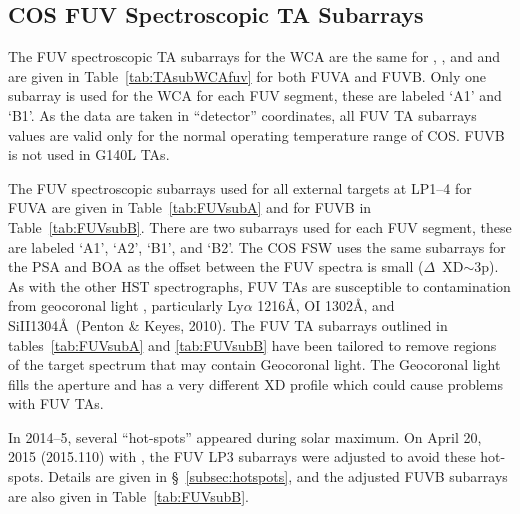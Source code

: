 \subsection{COS FUV Spectroscopic TA Subarrays}\label{subsec:FUVsupSUBS}
The FUV spectroscopic TA subarrays for the WCA are the same for ,  , and 
and are given in Table~\ref{tab:TAsubWCAfuv} for both FUVA and FUVB.
Only one subarray is used for the WCA for each FUV segment, these are labeled `A1' and `B1'.
As the data are taken in ``detector'' coordinates, all FUV TA subarrays values are valid only for the normal operating temperature range of COS. FUVB is not used in G140L TAs.

The FUV spectroscopic subarrays used for all external targets at LP1--4 for FUVA are given in Table~\ref{tab:FUVsubA} and for FUVB in Table~\ref{tab:FUVsubB}.
There are two subarrays used for each FUV segment, these are labeled `A1', `A2', `B1', and `B2'.
The COS FSW uses the same subarrays for the PSA and BOA as the offset between the FUV spectra is small ($\Delta$~XD$\sim$3p).
As with the other HST spectrographs, FUV TAs are susceptible to contamination from geocoronal light , particularly Ly$\alpha$ 1216\AA, {\rm O}\textsc{I} 1302\AA, and {\rm Si}{\sc II}1304\AA\ (Penton \& Keyes, 2010).
The FUV TA subarrays outlined in tables~\ref{tab:FUVsubA} and \ref{tab:FUVsubB} have been tailored to remove regions
of the target spectrum that may contain Geocoronal light.
The Geocoronal light fills the aperture and has a very different XD profile which could cause problems with FUV TAs.

In 2014--5, several ``hot-spots'' appeared during solar maximum. On April 20, 2015 (2015.110) with , the FUV LP3 subarrays were adjusted to avoid these hot-spots.
Details are given in \S~\ref{subsec:hotspots}, and the adjusted FUVB subarrays are also given in Table~\ref{tab:FUVsubB}.

